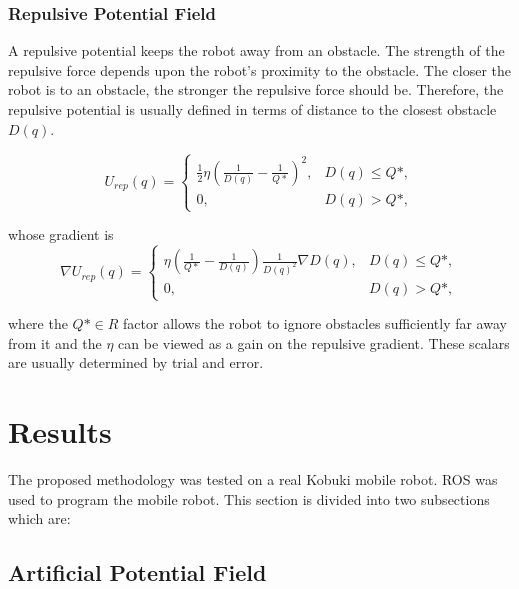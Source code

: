 \documentclass[conference]{IEEEtran}
\begin{document}
\subsubsection{\textbf{Repulsive Potential Field}}

A repulsive potential keeps the robot away from an obstacle. The strength of the repulsive force depends upon the robot's proximity to the obstacle. The closer the robot is to an obstacle, the stronger the repulsive force should be. Therefore, the repulsive potential is usually defined in terms of distance to the closest obstacle $D(q)$.

\begin{equation}
	U_{rep}(q) = 
		\begin{cases}
			\frac{1}{2}\eta(\frac{1}{D(q)} - \frac{1}{Q*})^2, & D(q)\leq Q*, \\
			0, & D(q) > Q*,
		\end{cases}
	\label{eq:pot_rep}
\end{equation}

whose gradient is
\begin{equation}
	\nabla U_{rep}(q) = 
		\begin{cases}
			\eta (\frac{1}{Q*} - \frac{1}{D(q)})\frac{1}{D(q)^2} \nabla D(q), &D(q) \leq Q*,\\
			0 , &D(q) > Q*,
		\end{cases}
	\label{eq:force_rep}
\end{equation}

where the $Q* \in R $ factor allows the robot to ignore obstacles sufficiently far away from it and the $\eta$ can be viewed as a gain on the repulsive gradient. These scalars are usually determined by trial and error.


\section{Results}
The proposed methodology was tested on a real Kobuki mobile robot. ROS was used to program the mobile robot. This section is divided into two subsections which are:

\subsection{Artificial Potential Field}
\end{document}
